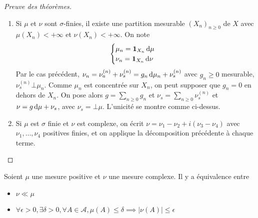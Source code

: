 \begin{proof}[Preuve des théorèmes]
\begin{enumerate}
Cela donne le théorème de Radon-Nikodym dans le cas $\mu,\nu$ positives fines. Montrons l'unicité. Supposons que $\nu= \nu_a+\nu_s = \nu_a' + \nu_s'$
Alors $\nu_a- \nu_a'= \nu_s'-\nu_s$, et il existe $N,N'\in \mathcal{A}$, avec $\mu(N)=\mu(N')=0$ et $\nu_s'((N')^c)=\nu_s (N^c)=0$.
Alors si $A\in \mathcal{A}$,
\begin{align*}
(\nu_s' -\nu_{s})(A) &= (\nu_s' -\nu_s)(A\cap (N\cup N' ))\\
&= (\nu_a- \nu_a' )(A\cap (N\cup N' ))\\
&=0 
\end{align*}
car $\mu(A\cap (N\cup N' ))\leq \mu(N\cup N' )=0$, donc $\nu_s=\nu_s'$ et $\nu_a=\nu_a'$.
De même, si $h\diff\mu=h'\diff\mu=\nu$ avec $h,h'\geq 0$, alors
\[ \int_{h' >h}h' \diff\mu = \nu(\{h' >h\})= \int_{h' >h}h\diff\mu\]
donc \[ \int_{h'>h}(h'-h)\diff\mu =0,\] d'où $\mu(\{h'>h\})=0$
et $h'\leq h$ $\mu$-presque partout, donc par symétrie des rôles $h=h'$
\item 
    Si $\mu$ et $\nu$ sont $\sigma$-finies,
il existe une partition mesurable $(X_n)_{n\geq 0}$ de $X$ avec $\mu(X_n)<+\infty$ et $\nu(X_n)<+\infty$.
On note \[
    \begin{cases}
    \mu_n=\bm{1}_{X_n}\mathop{}\!\mathrm d\mu\\ \nu_n=\bm{1}_{X_n}\mathop{}\!\mathrm d\nu
    \end{cases}\]
Par le cas précédent, $\nu_n = \nu_a^{(n)}+\nu_s^{(n)}=g_n \mathop{}\!\mathrm d\mu_n +\nu_s^{(n)}$ avec $g_n\geq 0$ mesurable, $\nu_s^{(n)}\bot \mu_n$.
Comme $\mu_n$ est concentrée sur $X_n$, on peut supposer que $g_n=0$ en dehors de $X_n$.
On pose alors $g= \sum_{n\geq0} g_n$ et $\nu_s =\sum_{n\geq 0}\nu_s^{(n)}$
et $\nu=g\mathop{}\!\mathrm d\mu+\nu_s$, avec $\nu_s=\bot \mu$. L'unicité se montre comme ci-dessus.
\item 
    Si $\mu$ est $\sigma$ finie et $\nu$ est complexe,
on écrit $\nu=\nu_1-\nu_2 +i(\nu_3-\nu_4)$ avec $\nu_1,\dots,\nu_4$ positives finies, et on applique la décomposition précédente à chaque terme.
    \end{enumerate}
\end{proof}

\begin{prop}
Soient $\mu$ une mesure positive et $\nu$ une mesure complexe. Il y a équivalence entre  \begin{itemize}
    \item $\nu\ll\mu$
    \item  $\forall  \epsilon>0, \exists  \delta>0, \forall  A \in  \mathcal  A, \mu(A)\leq \delta \implies |\nu(A)|\leq \epsilon$
\end{itemize}
\end{prop}

